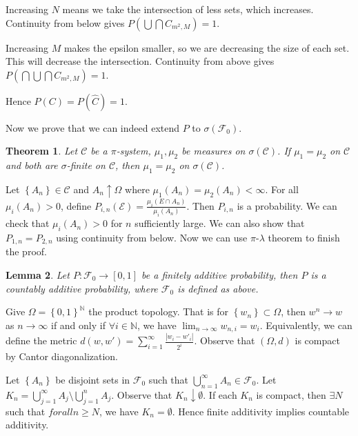 \documentclass[11pt]{article}
\newtheorem{thm}{Theorem}[section]
\newtheorem{lemma}[thm]{Lemma}
\theoremstyle{definition}
\newcommand{\sm}[0]{\setminus}
\newcommand{\set}[1]{\left\{ #1 \right\}}
\newcommand{\abs}[1]{\left\lvert#1\right\rvert} %
\newcommand{\NN}{\mathbb{N}}
\newcommand{\m}[1]{\mathcal{#1}}
\begin{document}
Increasing $N$ means we take the intersection of less sets, which increases.  Continuity
from below gives $P(\bigcup\bigcap{C_{m^2,M}})=1$. 

Increasing $M$ makes the epsilon smaller, so we are decreasing the size of each set. This
will decrease the intersection.  Continuity from above gives
$P(\bigcap\bigcup\bigcap{C_{m^2,M}})=1$. 

Hence $P(C)=P(\hat{C})=1$. 
\qedhere



Now we prove that we can indeed extend $P$ to $\sigma(\m{F}_0)$. 

\begin{thm}
    Let $\m{C}$ be a $\pi$-system, $\mu_1, \mu_2$ be measures on $\sigma(\m{C})$. If
    $\mu_1=\mu_2$ on $\m{C}$ and both are $\sigma$-finite on $\m{C}$, then $\mu_1=\mu_2$ on
    $\sigma(\m{C})$. 
\end{thm}
\proof
Let $\set{A_n}\in\m{C}$ and $A_n\uparrow\Omega$ where $\mu_1(A_n)=\mu_2(A_n)<\infty$. For
all $\mu_i(A_n) > 0$, define $P_{i,n}(\m{E}) = \frac{\mu_i(E\cap A_n)}{\mu_i(A_n)}$. Then
$P_{i,n}$ is a probability. We can check that $\mu_i(A_n)>0$ for $n$ sufficiently large. We
can also show that $P_{1,n}=P_{2,n}$ using continuity from below. Now we can use
$\pi$-$\lambda$ theorem to finish the proof. 
\qedhere

\begin{lemma}
    Let $P:\m{F}_0\to[0,1]$ be a finitely additive probability, then $P$ is a countably
    additive probability, where $\m{F}_0$ is defined as above.
\end{lemma}
\proof
Give $\Omega=\set{0,1}^\NN$ the product topology. That is for $\set{w_n}\subset\Omega$,
then $w^n\to w$ as $n\to\infty$ if and only if $\forall i\in\NN$, we have
$\lim_{n\to\infty} w_{n,i}=w_i$. Equivalently, we can define the metric $d(w,w') =
\sum_{i=1}^\infty \frac{\abs{w_i-w'_i}}{2^i}$. Observe that $(\Omega,d)$ is compact by
Cantor diagonalization. 

Let $\set{A_n}$ be disjoint sets in $\m{F}_0$ such that $\bigcup_{n=1}^\infty
A_n\in\m{F}_0$. Let $K_n=\bigcup_{j=1}^\infty A_j \sm \bigcup_{j=1}^n A_j$. Observe that
$K_n\downarrow\emptyset$. If each $K_n$ is compact, then $\exists N$ such that $forall
n\ge{N}$, we have $K_n=\emptyset$. Hence finite additivity implies countable additivity. 
\end{document}
